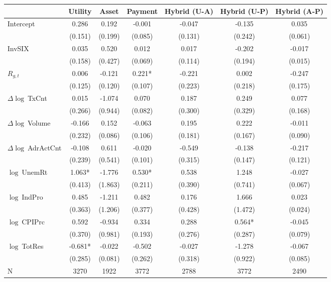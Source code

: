 \begin{table}[ht]
\centering
\scriptsize
\setlength{\tabcolsep}{4pt}
\begin{tabular}{l *{6}{c}}
\toprule
 & Utility & Asset & Payment & Hybrid (U-A) & Hybrid (U-P) & Hybrid (A-P) \\
\midrule
Intercept & 0.286 & 0.192 & -0.001 & -0.047 & -0.135 & 0.035 \\
 & (0.151) & (0.199) & (0.085) & (0.131) & (0.242) & (0.061) \\
\addlinespace
InvSIX & 0.035 & 0.520 & 0.012 & 0.017 & -0.202 & -0.017 \\
 & (0.158) & (0.427) & (0.069) & (0.114) & (0.194) & (0.015) \\
\addlinespace
$R_{g,t}$ & 0.006 & -0.121 & 0.221* & -0.221 & 0.002 & -0.247 \\
 & (0.125) & (0.120) & (0.107) & (0.223) & (0.218) & (0.175) \\
\addlinespace
$\Delta\log\ $TxCnt & 0.015 & -1.074 & 0.070 & 0.187 & 0.249 & 0.077 \\
 & (0.266) & (0.944) & (0.082) & (0.300) & (0.329) & (0.168) \\
\addlinespace
$\Delta\log\ $Volume & -0.166 & 0.152 & -0.063 & 0.195 & 0.222 & -0.011 \\
 & (0.232) & (0.086) & (0.106) & (0.181) & (0.167) & (0.090) \\
\addlinespace
$\Delta\log\ $AdrActCnt & -0.108 & 0.611 & -0.020 & -0.549 & -0.138 & -0.217 \\
 & (0.239) & (0.541) & (0.101) & (0.315) & (0.147) & (0.121) \\
\addlinespace
$\log\ $UnemRt & 1.063* & -1.776 & 0.530* & 0.538 & 1.248 & -0.027 \\
 & (0.413) & (1.863) & (0.211) & (0.390) & (0.741) & (0.067) \\
\addlinespace
$\log\ $IndPro & 0.485 & -1.211 & 0.482 & 0.176 & 1.666 & 0.023 \\
 & (0.363) & (1.206) & (0.377) & (0.428) & (1.472) & (0.024) \\
\addlinespace
$\log\ $CPIPrc & 0.592 & -0.934 & 0.334 & 0.288 & 0.564* & -0.045 \\
 & (0.370) & (0.981) & (0.193) & (0.276) & (0.287) & (0.079) \\
\addlinespace
$\log\ $TotRes & -0.681* & -0.022 & -0.502 & -0.027 & -1.278 & -0.067 \\
 & (0.285) & (0.081) & (0.262) & (0.318) & (0.922) & (0.085) \\
\addlinespace
\midrule
N & 3270 & 1922 & 3772 & 2788 & 3772 & 2490 \\

\end{tabular}
\end{table}
